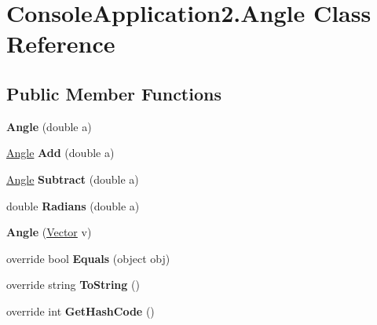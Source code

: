 \hypertarget{class_console_application2_1_1_angle}{}\section{Console\+Application2.\+Angle Class Reference}
\label{class_console_application2_1_1_angle}
\subsection*{Public Member Functions}
\begin{DoxyCompactItemize}
\item 
\hypertarget{class_console_application2_1_1_angle_a1b12047b4edf853fb60262bf1273fce6}{}{\bfseries Angle} (double a)\label{class_console_application2_1_1_angle_a1b12047b4edf853fb60262bf1273fce6}

\item 
\hypertarget{class_console_application2_1_1_angle_a9fb3465a2d358bd84f1a4ac3e19b9081}{}\hyperlink{class_console_application2_1_1_angle}{Angle} {\bfseries Add} (double a)\label{class_console_application2_1_1_angle_a9fb3465a2d358bd84f1a4ac3e19b9081}

\item 
\hypertarget{class_console_application2_1_1_angle_a275bd676da74d3ff2cdef44070b31cd8}{}\hyperlink{class_console_application2_1_1_angle}{Angle} {\bfseries Subtract} (double a)\label{class_console_application2_1_1_angle_a275bd676da74d3ff2cdef44070b31cd8}

\item 
\hypertarget{class_console_application2_1_1_angle_a71187aa1f87d3276320d598e15b06713}{}double {\bfseries Radians} (double a)\label{class_console_application2_1_1_angle_a71187aa1f87d3276320d598e15b06713}

\item 
\hypertarget{class_console_application2_1_1_angle_aeea0cfd75d11df299f0442903ed0be62}{}{\bfseries Angle} (\hyperlink{class_console_application2_1_1_vector}{Vector} v)\label{class_console_application2_1_1_angle_aeea0cfd75d11df299f0442903ed0be62}

\item 
\hypertarget{class_console_application2_1_1_angle_af5634a8fda5901ccd433cbbb2a3e995f}{}override bool {\bfseries Equals} (object obj)\label{class_console_application2_1_1_angle_af5634a8fda5901ccd433cbbb2a3e995f}

\item 
\hypertarget{class_console_application2_1_1_angle_a4af6dfc692c455ecb5435b8b017be764}{}override string {\bfseries To\+String} ()\label{class_console_application2_1_1_angle_a4af6dfc692c455ecb5435b8b017be764}

\item 
\hypertarget{class_console_application2_1_1_angle_a9e0eac58e58409f80d35dd6bedf1e37e}{}override int {\bfseries Get\+Hash\+Code} ()\label{class_console_application2_1_1_angle_a9e0eac58e58409f80d35dd6bedf1e37e}

\end{DoxyCompactItemize}
